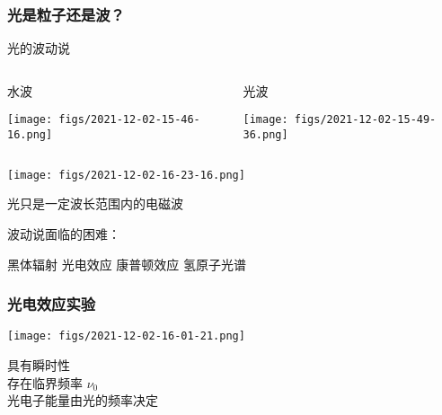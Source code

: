 \begin{frame} 
    \frametitle{光是粒子还是波？}
    \begin{figure}
        \centering
    \end{figure} 
    \setcounter{subfigure}{0}  
\end{frame}

\begin{frame} {光的波动说}
	\begin{columns}
		\begin{column}[t]{0.46\linewidth}
            水波
            \begin{center}
                \texttt{[image: figs/2021-12-02-15-46-16.png]}
            \end{center}
		\end{column}
		\begin{column}[t]{0.46\linewidth}
            光波
            \begin{center}
                \texttt{[image: figs/2021-12-02-15-49-36.png]}
            \end{center}
		\end{column}
	\end{columns}
\end{frame}

\begin{frame}
    \begin{center}
        \texttt{[image: figs/2021-12-02-16-23-16.png]}
    \end{center}
    光只是一定波长范围内的电磁波
\end{frame}

\begin{frame} 
    波动说面临的困难：
    \begin{itemize}
        \Item  黑体辐射
        \Item  光电效应
        \Item  康普顿效应
        \Item  氢原子光谱
    \end{itemize}
\end{frame}

\begin{frame} 
    \frametitle{光电效应实验}   
    \begin{center}
       \texttt{[image: figs/2021-12-02-16-01-21.png]}
   \end{center}  
   {\Bullet} 具有瞬时性 \\
   {\Bullet} 存在临界频率 $\nu_0$ \\
   {\Bullet} 光电子能量由光的频率决定
\end{frame}  

